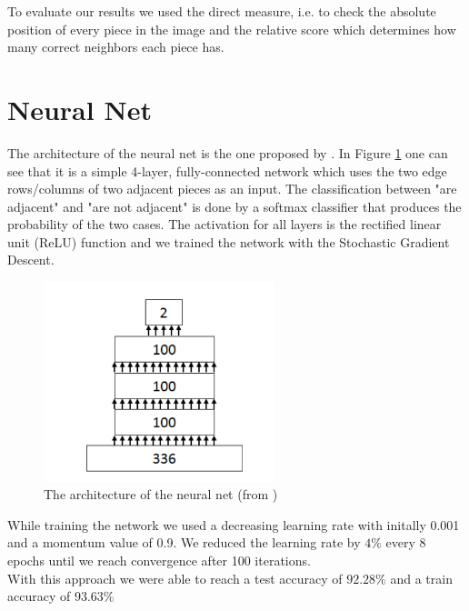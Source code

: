 \documentclass[11pt]{report}
\begin{document}
To evaluate our results we used the direct measure, i.e. to check the absolute position of every piece in the image and the relative score which determines how many correct neighbors each piece has.
\newpage

\section{Neural Net}
The architecture of the neural net is the one proposed by \cite{sholomon2016dnn}. In Figure \ref{fig:NN} one can see that it is a simple 4-layer, fully-connected network which uses the two edge rows/columns of two adjacent pieces as an input. The classification between "are adjacent" and "are not adjacent" is done by a softmax classifier that produces the probability of the two cases. The activation for all layers is the rectified linear unit (ReLU) function and we trained the network with the Stochastic Gradient Descent.
\begin{figure}[ht]
	\centering
	\includegraphics[width=0.6\textwidth]{NeuralNet.PNG}
	
	\caption{The architecture of the neural net (from \cite{sholomon2016dnn})}
	\label{fig:NN}
\end{figure}
While training the network we used a decreasing learning rate with initally 0.001 and a momentum value of 0.9. We reduced the learning rate by $4\%$ every 8 epochs until we reach convergence after 100 iterations. \\
With this approach we were able to reach a test accuracy of $92.28\%$ and a train accuracy of $93.63\%$
\end{document}
